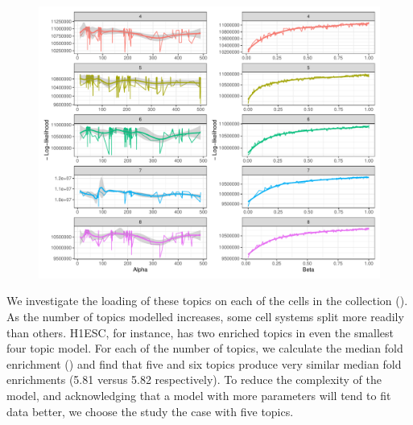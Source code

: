 
\begin{figure}
  \centering
  \includegraphics[width=\textwidth]{plot/ch4/sc_opt_params}
  \label{fig:sc_opt_params}
\end{figure}

We investigate the loading of these topics on each of the cells in the collection (). As the number of topics modelled increases, some cell systems split more readily than others. H1ESC, for instance, has two enriched topics in even the smallest four topic model. For each of the number of topics, we calculate the median fold enrichment () and find that five and six topics produce very similar median fold enrichments (5.81 versus 5.82 respectively). To reduce the complexity of the model, and acknowledging that a model with more parameters will tend to fit data better, we choose the study the case with five topics.  

